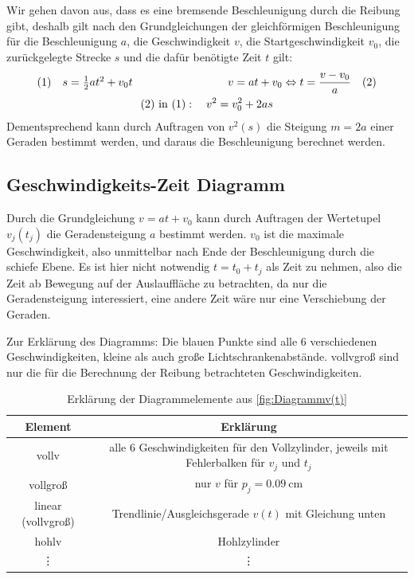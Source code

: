 Wir gehen davon aus, dass es eine bremsende Beschleunigung durch die Reibung gibt, deshalb gilt nach den Grundgleichungen der gleichförmigen Beschleunigung für die Beschleunigung \(a\), die Geschwindigkeit \(v\), die Startgeschwindigkeit \(v_0\), die zurückgelegte Strecke \(s\) und die dafür benötigte Zeit \(t\) gilt:
\begin{gather}
\begin{array}{c@{\hspace{3cm}}c}
 (1)\quad s=\frac{1}{2}at^2+v_0t &v=at+v_0\Leftrightarrow t=\dfrac{v-v_0}{a}\quad (2)\nonumber\\
\end{array}\\
(2)\text{ in }(1):\quad v^2=v_0^2+2as
\label{eq:v^2}
\end{gather}
Dementsprechend kann durch Auftragen von \(v^2(s)\) die Steigung \(m=2a\) einer Geraden bestimmt werden, und daraus die Beschleunigung berechnet werden. 
\newpage
\subsection{Geschwindigkeits-Zeit Diagramm}
Durch die Grundgleichung \(v=at+v_0\) kann durch Auftragen der Wertetupel \(v_j(t_j)\) die Geradensteigung \(a\) bestimmt werden.
\(v_0\) ist die maximale Geschwindigkeit, also unmittelbar nach Ende der Beschleunigung durch die schiefe Ebene. Es ist hier nicht notwendig \(t=t_0+t_j\) als Zeit zu nehmen, also die Zeit ab Bewegung auf der Auslauffläche zu betrachten, da nur die Geradensteigung interessiert, eine andere Zeit wäre nur eine Verschiebung der Geraden.\par
{}
Zur Erklärung des Diagramms: Die blauen Punkte sind alle 6 verschiedenen Geschwindigkeiten, kleine als auch große Lichtschrankenabstände. vollvgroß sind nur die für die Berechnung der Reibung betrachteten Geschwindigkeiten. \par
\setcellgapes{3pt}
\begin{table}[h]
\centering\makegapedcells
\caption{Erklärung der Diagrammelemente aus \cref{fig:Diagrammv(t)}}
\begin{tabular}{|c|c|}
\hline
Element & Erklärung  \\\hline
vollv & \makecell[c]{alle 6 Geschwindigkeiten für den Vollzylinder,\\ jeweils mit Fehlerbalken für \(v_j\) und \(t_j\)}\\
vollgroß & nur \(v\) für \(p_j=\qty{0.09}{\cm}\)\\
linear (vollvgroß) & Trendlinie/Ausgleichsgerade \(v(t)\) mit Gleichung unten\\\hline
hohlv & Hohlzylinder\\
\vdots & \vdots \\
\hline
\end{tabular}
\label{table:erklärung}
\end{table}
\newpage

